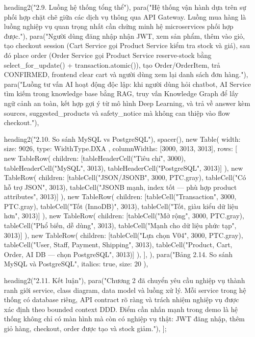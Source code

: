   heading2("2.9. Luồng hệ thống tổng thể"),
  para("Hệ thống vận hành dựa trên sự phối hợp chặt chẽ giữa các dịch vụ thông qua API Gateway. Luồng mua hàng là luồng nghiệp vụ quan trọng nhất cần chứng minh hệ microservices phối hợp được."),
  para("Người dùng đăng nhập nhận JWT, xem sản phẩm, thêm vào giỏ, tạo checkout session (Cart Service gọi Product Service kiểm tra stock và giá), sau đó place order (Order Service gọi Product Service reserve-stock bằng select_for_update() + transaction.atomic()), tạo Order/OrderItem, trả CONFIRMED, frontend clear cart và người dùng xem lại danh sách đơn hàng."),
  para("Luồng tư vấn AI hoạt động độc lập: khi người dùng hỏi chatbot, AI Service tìm kiếm trong knowledge base bằng RAG, truy vấn Knowledge Graph để lấy ngữ cảnh an toàn, kết hợp gợi ý từ mô hình Deep Learning, và trả về answer kèm sources, suggested_products và safety_notice mà không can thiệp vào flow checkout."),

  heading2("2.10. So sánh MySQL vs PostgreSQL"),
  spacer(),
  new Table({
    width: { size: 9026, type: WidthType.DXA },
    columnWidths: [3000, 3013, 3013],
    rows: [
      new TableRow({ children: [tableHeaderCell("Tiêu chí", 3000), tableHeaderCell("MySQL", 3013), tableHeaderCell("PostgreSQL", 3013)] }),
      new TableRow({ children: [tableCell("JSON/JSONB", 3000, PTC.gray), tableCell("Có hỗ trợ JSON", 3013), tableCell("JSONB mạnh, index tốt — phù hợp product attributes", 3013)] }),
      new TableRow({ children: [tableCell("Transaction", 3000, PTC.gray), tableCell("Tốt (InnoDB)", 3013), tableCell("Tốt, giàu kiểu dữ liệu hơn", 3013)] }),
      new TableRow({ children: [tableCell("Mở rộng", 3000, PTC.gray), tableCell("Phổ biến, dễ dùng", 3013), tableCell("Mạnh cho dữ liệu phức tạp", 3013)] }),
      new TableRow({ children: [tableCell("Lựa chọn V04", 3000, PTC.gray), tableCell("User, Staff, Payment, Shipping", 3013), tableCell("Product, Cart, Order, AI DB — chọn PostgreSQL", 3013)] }),
    ],
  }),
  para("Bảng 2.14. So sánh MySQL và PostgreSQL", { italics: true, size: 20 }),

  heading2("2.11. Kết luận"),
  para("Chương 2 đã chuyển yêu cầu nghiệp vụ thành ranh giới service, class diagram, data model và luồng xử lý. Mỗi service trong hệ thống có database riêng, API contract rõ ràng và trách nhiệm nghiệp vụ được xác định theo bounded context DDD. Điểm cần nhấn mạnh trong demo là hệ thống không chỉ có màn hình mà còn có nghiệp vụ thật: JWT đăng nhập, thêm giỏ hàng, checkout, order được tạo và stock giảm."),
];

